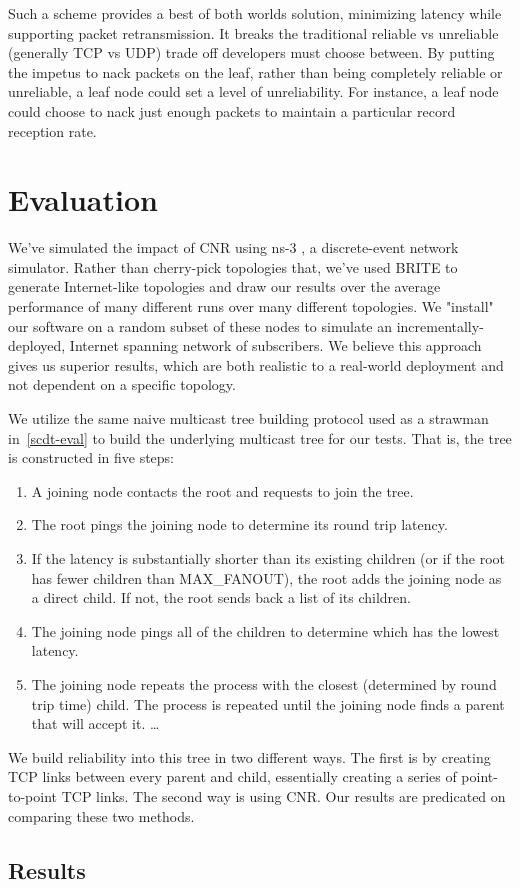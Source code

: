 Such a scheme provides a best of both worlds solution, minimizing latency while
supporting packet retransmission.  It breaks the
traditional reliable vs unreliable (generally TCP vs UDP) trade off developers
must choose between.  By putting the impetus to nack packets on the leaf, rather
than being completely reliable or unreliable, a leaf node could set a level of
unreliability.  For instance, a leaf node could choose to nack just enough
packets to maintain a particular record reception rate.


\section{Evaluation}

We've simulated the impact of CNR using ns-3 \cite{ns3}, a discrete-event network simulator. Rather than cherry-pick topologies that, we've used BRITE \cite{brite} to generate Internet-like topologies and draw our results over the average performance of many different runs over many different topologies. We "install" our software on a random subset of these nodes to simulate an incrementally-deployed, Internet spanning network of subscribers. We believe this approach gives us superior results, which are both realistic to a real-world deployment and not dependent on a specific topology. 

We utilize the same naive multicast tree building protocol used as a strawman in~\autoref{scdt-eval} to build the underlying multicast tree for our tests. That is, the tree is constructed in five steps: 

\begin{enumerate}  
	\item A joining node contacts the root and requests to join the tree. 
	\item The root pings the joining node to determine its round trip latency. 
	\item If the latency is substantially shorter than its existing children (or if the root has fewer children than MAX\_FANOUT), the root adds the joining node as a direct child. If not, the root sends back a list of its children.
	\item The joining node pings all of the children to determine which has the lowest latency.
	\item The joining node repeats the process with the closest (determined by round trip time) child. The process is repeated until the joining node finds a parent that will accept it.  \ldots 
\end{enumerate}

We build reliability into this tree in two different ways. The first is by creating TCP links between every parent and child, essentially creating a series of point-to-point TCP links. The second way is using CNR. Our results are predicated on comparing these two methods. 

\subsection{Results}
